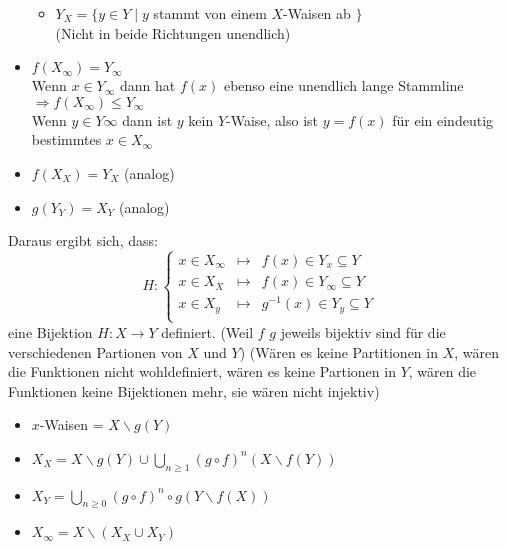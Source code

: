 \documentclass[main.tex]{subfiles}
\begin{document}
\begin{Beweis}
\begin{itemize}
\begin{itemize}
      \item $Y_X = \{ y \in Y \mid y$ stammt von einem $X$-Waisen ab $\}$\\
        (Nicht in beide Richtungen unendlich)
    \end{itemize}
    \item $f(X_\infty) = Y_\infty$\\
    Wenn $x\in Y_\infty$ dann hat $f(x)$ ebenso eine unendlich lange Stammline $\Rightarrow f(X_\infty) \leq Y_\infty$\\
    Wenn $y\in Y\infty$ dann ist $y$ kein $Y$-Waise, also ist $y=f(x)$ für ein eindeutig bestimmtes $x\in X_\infty$
    \item $f(X_X)=Y_X$ (analog)
    \item $g(Y_Y) = X_Y$ (analog)
  \end{itemize}
  
  Daraus ergibt sich, dass:
  $$ H : \left \{ \begin{aligned}
      x\in X_\infty &\mapsto& f(x)\in Y_x \subseteq Y\\
      x\in X_X &\mapsto& f(x)\in Y_\infty \subseteq Y\\
      x\in X_y &\mapsto& g^{-1}(x)\in Y_y \subseteq Y\\
  \end{aligned}\right .$$
  eine Bijektion $H: X\to Y $ definiert. (Weil $f$ $g$ jeweils bijektiv sind für die verschiedenen Partionen von $X$ und $Y$) (Wären es keine Partitionen in $X$, wären die Funktionen nicht wohldefiniert, wären es keine Partionen in $Y$, wären die Funktionen keine Bijektionen mehr, sie wären nicht injektiv)
\end{Beweis}

\begin{Bemerkung}[formaler]
  \begin{itemize}
    \item $x$-Waisen = $X \backslash g(Y)$
    \item $X_X = X \backslash g(Y) \cup \bigcup_{n \geq 1} (g \circ f)^n (X \backslash f(Y))$
    \item $X_Y = \bigcup_{n\geq 0 } (g\circ f)^n \circ g (Y \backslash f(X))$
    \item $X_\infty = X \backslash (X_X \cup X_Y)$
  \end{itemize}
\end{Bemerkung}
\end{document}

